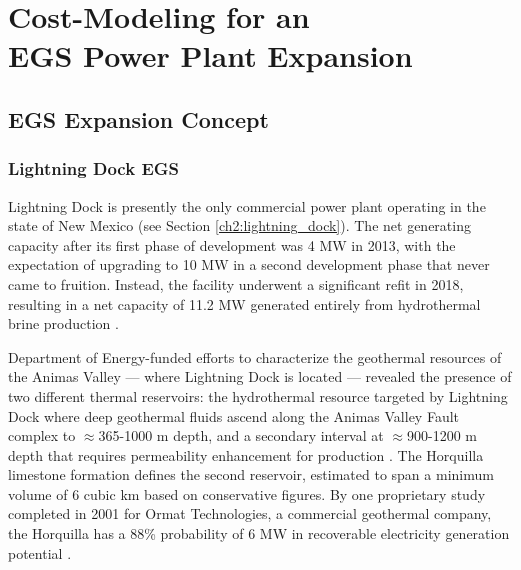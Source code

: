\chapter{Cost-Modeling for an\\EGS Power Plant Expansion}\label{ch4:cm_prep}
\section{EGS Expansion Concept}\label{ch4:cm_concept}
\subsection{Lightning Dock EGS}\label{ch4:lightning_dock_egs}
Lightning Dock is presently the only commercial power plant operating in the state of New Mexico (see Section \ref{ch2:lightning_dock}). The net generating capacity after its first phase of development was 4 MW in 2013, with the expectation of upgrading to 10 MW in a second development phase that never came to fruition. Instead, the facility underwent a significant refit in 2018, resulting in a net capacity of 11.2 MW generated entirely from hydrothermal brine production \citep{bonafin_repowering_2019}.

Department of Energy-funded efforts to characterize the geothermal resources of the Animas Valley --- where Lightning Dock is located --- revealed the presence of two different thermal reservoirs: the hydrothermal resource targeted by Lightning Dock where deep geothermal fluids ascend along the Animas Valley Fault complex to $\approx$365-1000 m depth, and a secondary interval at $\approx$900-1200 m depth that requires permeability enhancement for production \citep{schochet_development_2001}. The Horquilla limestone formation defines the second reservoir, estimated to span a minimum volume of 6 cubic km based on conservative figures. By one proprietary study completed in 2001 for Ormat Technologies, a commercial geothermal company, the Horquilla has a 88\% probability of 6 MW in recoverable electricity generation potential \citep{schochet_development_2001}.

